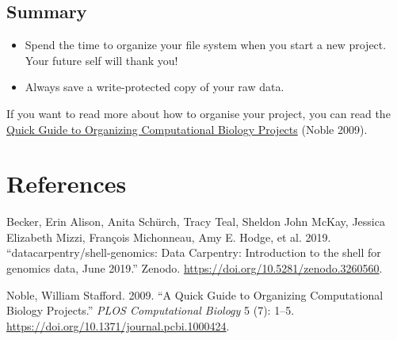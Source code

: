 \documentclass[
  letterpaper,
  DIV=11,
  numbers=noendperiod]{scrreprt}
\providecommand{\tightlist}{%
  \setlength{\itemsep}{0pt}\setlength{\parskip}{0pt}}\usepackage{longtable,booktabs,array}
\newlength{\cslhangindent}
\newenvironment{CSLReferences}[2] %
 {\begin{list}{}{%
  \setlength{\itemindent}{0pt}
  \setlength{\leftmargin}{0pt}
  \setlength{\parsep}{0pt}
  \ifodd #1
   \setlength{\leftmargin}{\cslhangindent}
   \setlength{\itemindent}{-1\cslhangindent}
  \fi
  \setlength{\itemsep}{#2\baselineskip}}}
 {\end{list}}
\begin{document}
\section{Summary}\label{summary-5}

\begin{tcolorbox}[enhanced jigsaw, opacitybacktitle=0.6, colback=white, coltitle=black, opacityback=0, rightrule=.15mm, toptitle=1mm, toprule=.15mm, bottomtitle=1mm, colframe=quarto-callout-important-color-frame, arc=.35mm, titlerule=0mm, colbacktitle=quarto-callout-important-color!10!white, leftrule=.75mm, title=\textcolor{quarto-callout-important-color}{\faExclamation}\hspace{0.5em}{Key points}, breakable, bottomrule=.15mm, left=2mm]

\begin{itemize}
\tightlist
\item
  Spend the time to organize your file system when you start a new
  project. Your future self will thank you!
\item
  Always save a write-protected copy of your raw data.
\end{itemize}

\end{tcolorbox}

If you want to read more about how to organise your project, you can
read the
\href{http://journals.plos.org/ploscompbiol/article?id=10.1371/journal.pcbi.1000424}{Quick
Guide to Organizing Computational Biology Projects} (Noble 2009).


\chapter*{References}\label{references}


\label{refs}
\begin{CSLReferences}{1}{0}
Becker, Erin Alison, Anita Schürch, Tracy Teal, Sheldon John McKay,
Jessica Elizabeth Mizzi, François Michonneau, Amy E. Hodge, et al. 2019.
{``{datacarpentry/shell-genomics: Data Carpentry: Introduction to the
shell for genomics data, June 2019}.''} Zenodo.
\url{https://doi.org/10.5281/zenodo.3260560}.

Noble, William Stafford. 2009. {``A Quick Guide to Organizing
Computational Biology Projects.''} \emph{PLOS Computational Biology} 5
(7): 1--5. \url{https://doi.org/10.1371/journal.pcbi.1000424}.

\end{CSLReferences}
\end{document}
